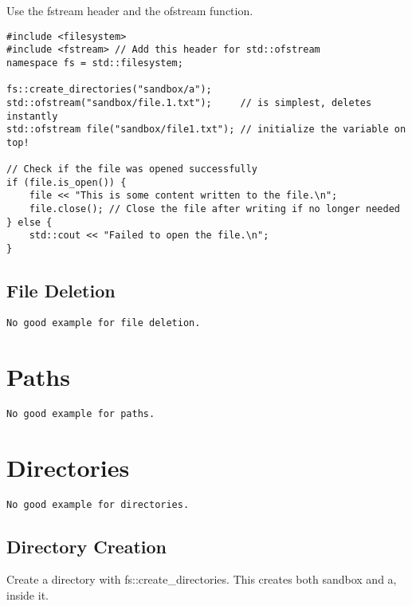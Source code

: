 Use the fstream header and the ofstream function.

\begin{verbatim}
#include <filesystem>
#include <fstream> // Add this header for std::ofstream
namespace fs = std::filesystem;

fs::create_directories("sandbox/a");
std::ofstream("sandbox/file.1.txt");     // is simplest, deletes instantly
std::ofstream file("sandbox/file1.txt"); // initialize the variable on top!

// Check if the file was opened successfully
if (file.is_open()) {
    file << "This is some content written to the file.\n";
    file.close(); // Close the file after writing if no longer needed
} else {
    std::cout << "Failed to open the file.\n";
}
\end{verbatim}

\subsection{File Deletion}
\begin{verbatim}
No good example for file deletion.
\end{verbatim}


\section{Paths}

\begin{verbatim}
No good example for paths.
\end{verbatim}

\section{Directories}

\begin{verbatim}
No good example for directories.
\end{verbatim}

\subsection{Directory Creation}

Create a directory with fs::create\_directories. This creates both sandbox and a, inside it.

